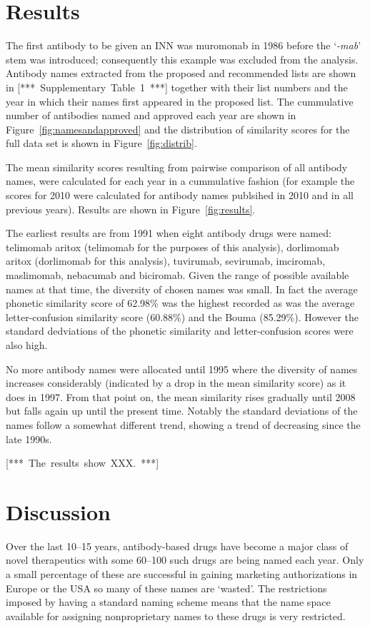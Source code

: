 \documentclass{article}
\newcommand{\eg}[1]{\mbox{`\emph{#1}'}}
\newcommand{\note}[1]{\mbox{\color{red}[*** #1 ***]}}
\begin{document}
\section{Results}
The first antibody to be given an INN was muromonab in 1986 before the
\eg{-mab} stem was introduced; consequently this example was excluded
from the analysis. Antibody names extracted from the proposed and
recommended lists are shown in \note{Supplementary Table~1} together
with their list numbers and the year in which their names first
appeared in the proposed list. The cummulative number of antibodies
named and approved each year are shown in
Figure~\ref{fig:namesandapproved} and the distribution of similarity
scores for the full data set is shown in Figure~\ref{fig:distrib}.

The mean similarity scores resulting from pairwise comparison of all
antibody names, were calculated for each year in a cummulative fashion
(for example the scores for 2010 were calculated for antibody names
publsihed in 2010 and in all previous years). Results are shown in
Figure~\ref{fig:results}. 

The earliest results are from 1991 when eight antibody drugs were
named: telimomab aritox (telimomab for the purposes of this analysis),
dorlimomab aritox (dorlimomab for this analysis), tuvirumab,
sevirumab, imciromab, maslimomab, nebacumab and biciromab. Given the
range of possible available names at that time, the diversity of
chosen names was small. In fact the average phonetic similarity score
of 62.98\% was the highest recorded as was the average
letter-confusion similarity score (60.88\%) and the Bouma
(85.29\%). However the standard dedviations of the phonetic similarity
and letter-confusion scores were also high.

No more antibody names were allocated until 1995 where the diversity
of names increases considerably (indicated by a drop in the mean
similarity score) as it does in 1997. From that point on, the mean
similarity rises gradually until 2008 but falls again up until the
present time. Notably the standard deviations of the names follow a
somewhat different trend, showing a trend of decreasing since the late
1990s. 


\note{The results show XXX.}

\section{Discussion}
Over the last 10--15 years, antibody-based drugs have become a major
class of novel therapeutics with some 60--100 such drugs are being
named each year. Only a small percentage of these are successful in
gaining marketing authorizations in Europe or the USA so many of these
names are `wasted'. The restrictions imposed by having a standard
naming scheme means that the name space available for assigning
nonproprietary names to these drugs is very restricted.
\end{document}

